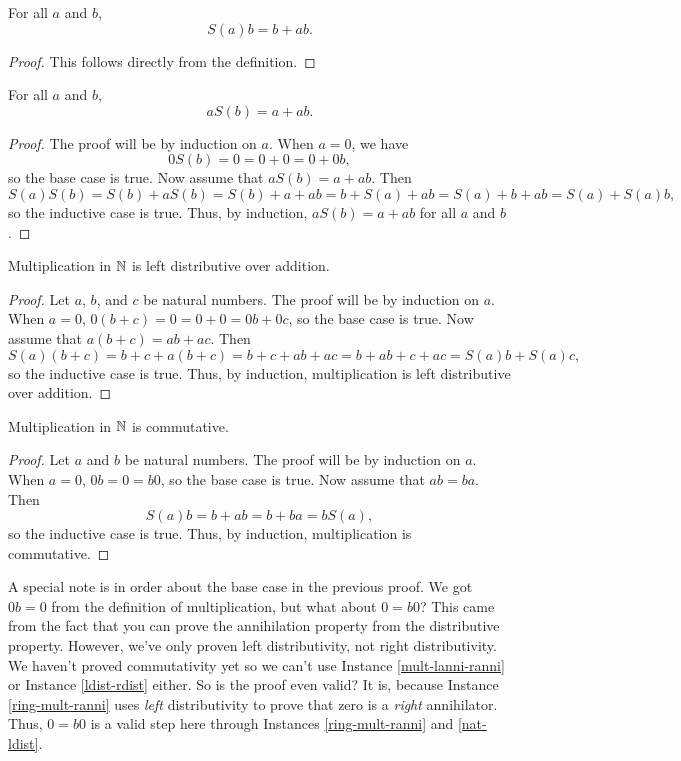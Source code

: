 \documentclass[../math.tex]{subfiles}
\begin{document}
\begin{theorem}
    For all $a$ and $b$,
    \[
        S(a)b = b + ab.
    \]
\end{theorem}
\begin{proof}
    This follows directly from the definition.
\end{proof}

\begin{theorem}
    For all $a$ and $b$,
    \[
        aS(b) = a + ab.
    \]
\end{theorem}
\begin{proof}
    The proof will be by induction on $a$.  When $a = 0$, we have
    \[
        0S(b) = 0 = 0 + 0 = 0 + 0b,
    \]
    so the base case is true.  Now assume that $aS(b) = a + ab$.  Then
    \[
        S(a)S(b) = S(b) + aS(b) = S(b) + a + ab = b + S(a) + ab = S(a) + b + ab
        = S(a) + S(a)b,
    \]
    so the inductive case is true.  Thus, by induction, $aS(b) = a + ab$ for all
    $a$ and $b$.
\end{proof}

\begin{instance} \label{nat-ldist}
    Multiplication in $\mathbb{N}$ is left distributive over addition.
\end{instance}
\begin{proof}
    Let $a$, $b$, and $c$ be natural numbers.  The proof will be by induction on
    $a$.  When $a = 0$, $0(b + c) = 0 = 0 + 0 = 0b + 0c$, so the base case is
    true.  Now assume that $a(b + c) = ab + ac$.  Then
    \[
        S(a)(b + c) = b + c + a(b + c) = b + c + ab + ac = b + ab + c + ac =
        S(a)b + S(a)c,
    \]
    so the inductive case is true.  Thus, by induction, multiplication is left
    distributive over addition.
\end{proof}

\begin{instance}
    Multiplication in $\mathbb{N}$ is commutative.
\end{instance}
\begin{proof}
    Let $a$ and $b$ be natural numbers.  The proof will be by induction on $a$.
    When $a = 0$, $0b = 0 = b0$, so the base case is true.  Now assume that $ab
    = ba$.  Then
    \[
        S(a)b = b + ab = b + ba = bS(a),
    \]
    so the inductive case is true.  Thus, by induction, multiplication is
    commutative.
\end{proof}
A special note is in order about the base case in the previous proof.  We got
$0b = 0$ from the definition of multiplication, but what about $0 = b0$?  This
came from the fact that you can prove the annihilation property from the
distributive property.  However, we've only proven left distributivity, not
right distributivity.  We haven't proved commutativity yet so we can't use
Instance \ref{mult-lanni-ranni} or Instance \ref{ldist-rdist} either.  So is the
proof even valid?  It is, because Instance \ref{ring-mult-ranni} uses
\textit{left} distributivity to prove that zero is a \textit{right} annihilator.
Thus, $0 = b0$ is a valid step here through Instances \ref{ring-mult-ranni} and
\ref{nat-ldist}.
\end{document}
